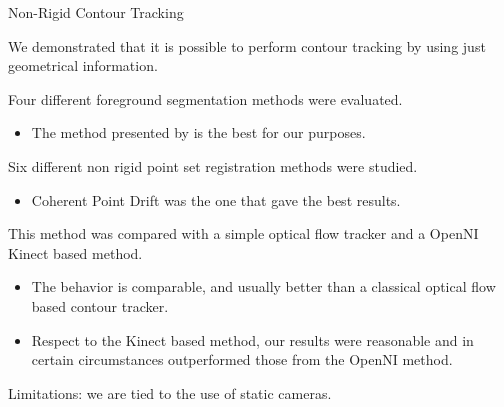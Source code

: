 \begin{frame}{Non-Rigid Contour Tracking}
  \small
  \begin{itemize}
     {
    \item We demonstrated that it is possible to perform contour tracking by using just geometrical information. 
    \item Four different foreground segmentation methods \citep{lopez2011stochastic, lopez2011foreground, guo2011hierarchical, reddy2012improved} were evaluated.
    \begin{itemize}
     \item The method presented by \cite{reddy2012improved} is the best for our purposes.
    \end{itemize}
    \item Six different non rigid point set registration methods \citep{besl1992method, chui2000new, myronenko2010point, zheng2006robust, lian2012rotation} were studied.
    \begin{itemize}
     \item Coherent Point Drift \citep{myronenko2010point} was the one that gave the best results. 
    \end{itemize}
    }
     {
    \item This method was compared with a simple optical flow tracker and a OpenNI Kinect based method. 
    \begin{itemize}
     \item The behavior is comparable, and usually better than a classical optical flow based contour tracker. 
     \item Respect to the Kinect based method, our results were reasonable and in certain circumstances outperformed those from the OpenNI method.
    \end{itemize}
    \item Limitations: we are tied to the use of static cameras.
    }
  \end{itemize}
\end{frame}


